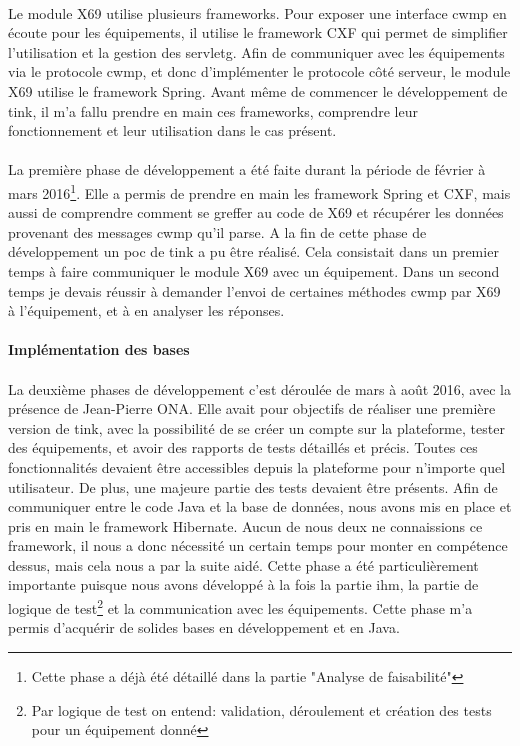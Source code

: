 \documentclass[12pt,a4paper]{report}
\begin{document}
\paragraph*{}Le module X69 utilise plusieurs frameworks. Pour exposer une interface \gls{cwmp} en écoute pour les équipements, il utilise le framework CXF qui permet de simplifier l'utilisation et la gestion des \gls{servletg}. Afin de communiquer avec les équipements via le protocole \gls{cwmp}, et donc d'implémenter le protocole côté serveur, le module X69 utilise le framework Spring. Avant même de commencer le développement de \gls{tink}, il m'a fallu prendre en main ces frameworks, comprendre leur fonctionnement et leur utilisation dans le cas présent.
\paragraph*{}La première phase de développement a été faite durant la période de février à mars 2016\footnote{Cette phase a déjà été détaillé dans la partie "Analyse de faisabilité"}. Elle a permis de prendre en main les framework Spring et CXF, mais aussi de comprendre comment se greffer au code de X69 et récupérer les données provenant des messages \gls{cwmp} qu'il parse. A la fin de cette phase de développement un \gls{poc} de \gls{tink} a pu être réalisé. Cela consistait dans un premier temps à faire communiquer le module X69 avec un équipement. Dans un second temps je devais réussir à demander l'envoi de certaines méthodes \gls{cwmp} par X69 à l'équipement, et à en analyser les réponses.
\paragraph{Implémentation des bases}
\paragraph*{}La deuxième phases de développement c'est déroulée de mars à août 2016, avec la présence de Jean-Pierre ONA. Elle avait pour objectifs de réaliser une première version de \gls{tink}, avec la possibilité de se créer un compte sur la plateforme, tester des équipements, et avoir des rapports de tests détaillés et précis. Toutes ces fonctionnalités devaient être accessibles depuis la plateforme pour n'importe quel utilisateur. De plus, une majeure partie des tests devaient être présents. Afin de communiquer entre le code Java et la base de données, nous avons mis en place et pris en main le framework Hibernate. Aucun de nous deux ne connaissions ce framework, il nous a donc nécessité un certain temps pour monter en compétence dessus, mais cela nous a par la suite aidé. Cette phase a été particulièrement importante puisque nous avons développé à la fois la partie \gls{ihm}, la partie de logique de test\footnote{Par logique de test on entend: validation, déroulement et création des tests pour un équipement donné} et la communication avec les équipements. Cette phase m'a permis d'acquérir de solides bases en développement et en Java.
\end{document}
